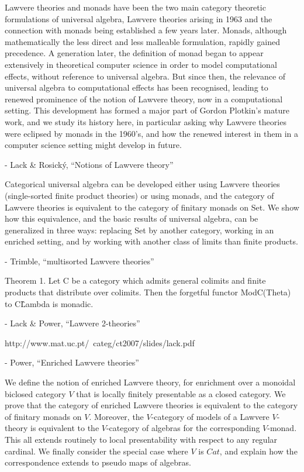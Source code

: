 \documentclass{article}
\begin{document}
  Lawvere theories and monads have been the two main category theoretic formulations of universal algebra, Lawvere theories arising in 1963 and the connection with monads being established a few years later. Monads, although mathematically the less direct and less malleable formulation, rapidly gained precedence. A generation later, the definition of monad began to appear extensively in theoretical computer science in order to model computational effects, without reference to universal algebra. But since then, the relevance of universal algebra to computational effects has been recognised, leading to renewed prominence of the notion of Lawvere theory, now in a computational setting. This development has formed a major part of Gordon Plotkin’s mature work, and we study its history here, in particular asking why Lawvere theories were eclipsed by monads in the 1960’s, and how the renewed interest in them in a computer science setting might develop in future.

- Lack \& Rosick\'y, ``Notions of Lawvere theory''

  Categorical universal algebra can be developed either using Lawvere theories (single-sorted finite product theories) or using monads, and the category of Lawvere theories is equivalent to the category of finitary monads on Set. We show how this equivalence, and the basic results of universal algebra, can be generalized in three ways: replacing Set by another category, working in an enriched setting, and by working with another class of limits than finite products.
  
- Trimble, ``multisorted Lawvere theories''

  Theorem 1. Let C be a category which admits general colimits and finite products that distribute over colimits. Then the forgetful functor ModC(Theta) to C\^Lambda is monadic.

- Lack \& Power, ``Lawvere 2-theories''

  http://www.mat.uc.pt/~categ/ct2007/slides/lack.pdf

- Power, ``Enriched Lawvere theories''

  We define the notion of enriched Lawvere theory, for enrichment over a monoidal biclosed category $V$ that is locally finitely presentable as a closed category. We prove that the category of enriched Lawvere theories is equivalent to the category of finitary monads on $V$. Moreover, the $V$-category of models of a Lawvere $V$-theory is equivalent to the $V$-category of algebras for the corresponding $V$-monad. This all extends routinely to local presentability with respect to any regular cardinal. We finally consider the special case where $V$ is $Cat$, and explain how the correspondence extends to pseudo maps of algebras.
\end{document}
